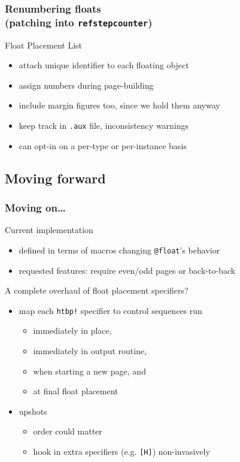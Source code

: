\documentclass{beamer}
\def\cs#1{\texttt{\expandafter\string\csname#1\endcsname}}
\begin{document}
\begin{frame}
  \frametitle{Renumbering floats\\\normalsize(patching into \cs{refstepcounter})}
  \begin{block}{Float Placement List}
    \begin{itemize}
    \item attach unique identifier to each floating object
    \item assign numbers during page-building
    \item include margin figures too, since we hold them anyway
    \item keep track in \texttt{.aux} file, inconsistency warnings
    \item can opt-in on a per-type or per-instance basis
    \end{itemize}
  \end{block}
\end{frame}

\subsection{Moving forward}
\begin{frame}
  \frametitle{Moving on\ldots}
  \begin{block}{Current implementation}
    \begin{itemize}
    \item defined in terms of macros changing \cs{@float}'s behavior
    \item requested features: require even/odd pages or back-to-back
    \end{itemize}
  \end{block}
  \begin{block}{A complete overhaul of float placement specifiers?}
    \begin{itemize}
    \item map each \texttt{htbp!} specifier to control sequences run
      \begin{itemize}
      \item immediately in place,
      \item immediately in output routine,
      \item when starting a new page, and
      \item at final float placement
      \end{itemize}
    \item upshots
      \begin{itemize}
      \item order could matter
      \item hook in extra specifiers (e.g. \texttt{[H]}) non-invasively
      \end{itemize}
    \end{itemize}
  \end{block}
\end{frame}
\end{document}
